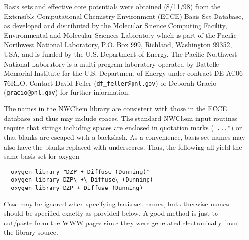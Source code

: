 \label{sec:knownbasis}

Basis sets and effective core potentials were obtained (8/11/98) from
the Extensible Computational Chemistry Environment (ECCE) Basis Set
Database, as developed and distributed by the Molecular Science
Computing Facility, Environmental and Molecular Sciences Laboratory
which is part of the Pacific Northwest National Laboratory, P.O. Box
999, Richland, Washington 99352, USA, and is funded by the
U.S. Department of Energy.  The Pacific Northwest National Laboratory
is a multi-program laboratory operated by Battelle Memorial Institute
for the U.S. Department of Energy under contract DE-AC06-76RLO.
Contact David Feller (\verb+df_feller@pnl.gov+) or Deborah Gracio
(\verb+gracio@pnl.gov+) for further information.

The names in the NWChem library are consistent with those in the ECCE
database and thus may include spaces.  The standard NWChem input
routines require that strings including spaces are enclosed in
quotation marks (\verb+"..."+) or that blanks are escaped with a
backslash.  As a convenience, basis set names may also have the blanks
replaced with underscores.  Thus, the following all yield the same
basis set for oxygen
\begin{verbatim}
  oxygen library "DZP + Diffuse (Dunning)"
  oxygen library DZP\ +\ Diffuse\ (Dunning)
  oxygen library DZP_+_Diffuse_(Dunning)
\end{verbatim}

Case may be ignored when specifying basis set names, but otherwise
names should be specified exactly as provided below.  A good method is
just to cut/paste from the WWW pages since they were generated
electronically from the library source.

